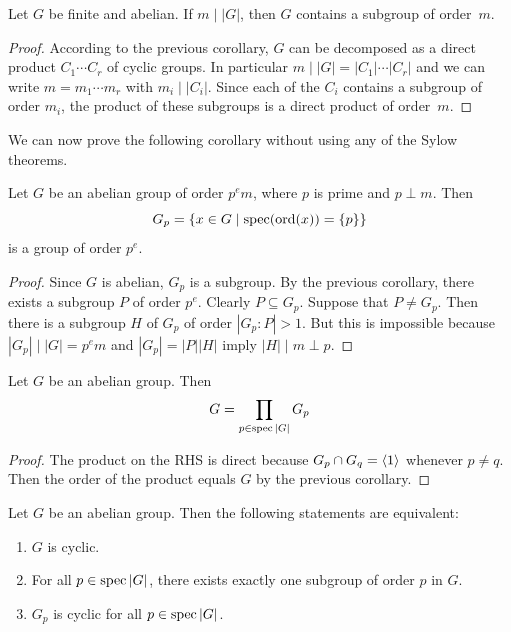 \begin{cor}\label{subgroup-of-compatible-order}
    Let $G$ be finite and abelian. If $m\mid|G|$, then $G$ contains a subgroup of order~$m$.
\end{cor}

\begin{proof} According to the previous corollary, $G$ can be decomposed as a direct product $C_1\cdots C_r$ of cyclic groups. In particular $m\mid|G|=|C_1|\cdots|C_r|$ and we can write $m=m_1\cdots m_r$ with $m_i\mid|C_i|$. Since each of the $C_i$ contains a subgroup of order $m_i$, the product of these subgroups is a direct product of order~$m$.  \end{proof}

We can now prove the following corollary without using any of the Sylow theorems.

\begin{cor}
    Let $G$ be an abelian group of order $p^em$, where $p$ is prime and $p\perp m$. Then
    $$
        G_p =\{x\in G\mid\operatorname{spec}({\rm ord}(x))=\{p\}\}
    $$
    is a group of order $p^e$.
\end{cor}

\begin{proof} Since $G$ is abelian, $G_p$ is a subgroup. By the previous corollary, there exists a subgroup $P$ of order $p^e$. Clearly $P\subseteq G_p$. Suppose that $P\ne G_p$. Then there is a subgroup $H$ of $G_p$ of order $|G_p:P|>1$. But this is impossible because $|G_p|\mid|G|=p^em$ and $|G_p|=|P||H|$ imply $|H|\mid m\perp p$.  \end{proof}

\begin{cor}\label{product-of-all-Gp}
    Let\/ $G$ be an abelian group. Then
$$
    G = \prod_{p \in \operatorname{spec}|G|} G_p
$$
\end{cor}

\begin{proof} The product on the RHS is direct because $G_p\cap G_q=\langle1\rangle$ whenever $p\ne q$. Then the order of the product equals $G$ by the previous corollary.  \end{proof}

\begin{thm}
    Let\/ $G$ be an abelian group. Then the following statements are equivalent:
    \begin{enumerate}[\upshape a)]
      \item $G$ is cyclic.
      \item For all\/ $p \in \operatorname{spec}|G|$, there exists exactly one subgroup of order\/ $p$ in\/ $G$.
      \item $G_p$ is cyclic for all\/ $p \in \operatorname{spec}|G|$.
    \end{enumerate}
\end{thm}

